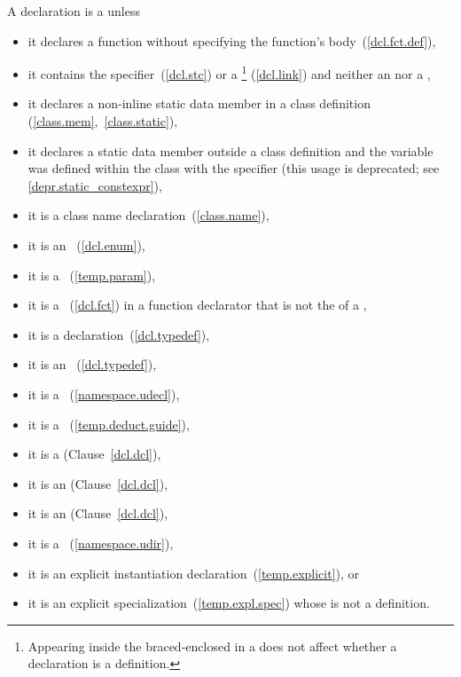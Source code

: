 \pnum
{}%
%
A declaration is a  unless
\begin{itemize}
\item
it declares a function
without specifying the function's body~(\ref{dcl.fct.def}),
\item
it contains
the
%
 specifier~(\ref{dcl.stc}) or a
\footnote{Appearing inside the braced-enclosed
 in a  does
not affect whether a declaration is a definition.}
(\ref{dcl.link}) and neither an  nor a
,
\item
{}%
it declares a non-inline static data member in a class
definition (\ref{class.mem},~\ref{class.static}),
\item
it declares a static data member outside a class definition
and the variable was defined within the class with the 
specifier (this usage is deprecated; see \ref{depr.static_constexpr}),
\item
{}%
it is a class name declaration~(\ref{class.name}),
\item
it is an
%
~(\ref{dcl.enum}),
\item
it is a
%
~(\ref{temp.param}),
\item
it is a
%
~(\ref{dcl.fct}) in a function
%
declarator that is not the  of a
,
\item
it is a
%
 declaration~(\ref{dcl.typedef}),
\item it is
an ~(\ref{dcl.typedef}),
\item it is
a
~(\ref{namespace.udecl}),
\item it is
a ~(\ref{temp.deduct.guide}),
\item it is
a  (Clause~\ref{dcl.dcl}),
\item
it is an
 (Clause~\ref{dcl.dcl}),
\item
it is an
 (Clause~\ref{dcl.dcl}),
\item it is
a ~(\ref{namespace.udir}),
\item it is
an explicit instantiation declaration~(\ref{temp.explicit}), or
\item it is
an explicit specialization~(\ref{temp.expl.spec}) whose
 is not a definition.
\end{itemize}
